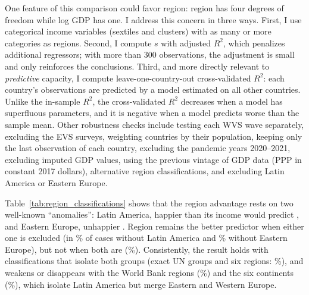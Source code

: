 \documentclass[11pt]{article}
\begin{document}
One feature of this comparison could favor region: region has four degrees of freedom while log GDP has one. I address this concern in three ways. First, I use categorical income variables (sextiles and clusters) with as many or more categories as regions. Second, I compute $s$ with adjusted $R^2$, which penalizes additional regressors; with more than 300 observations, the adjustment is small and only reinforces the conclusions. Third, and more directly relevant to \textit{predictive} capacity, I compute leave-one-country-out cross-validated $R^2$: each country's observations are predicted by a model estimated on all other countries. Unlike the in-sample $R^2$, the cross-validated $R^2$ decreases when a model has superfluous parameters, and it is negative when a model predicts worse than the sample mean. Other robustness checks include testing each WVS wave separately, excluding the EVS surveys, weighting countries by their population, keeping only the last observation of each country, excluding the pandemic years 2020--2021, excluding imputed GDP values, using the previous vintage of GDP data (PPP in constant 2017 dollars), alternative region classifications, and excluding Latin America or Eastern Europe.

Table~\ref{tab:region_classifications} shows that the region advantage rests on two well-known ``anomalies'': Latin America, happier than its income would predict \citep{graham_paradox_2009,rojas_handbook_2016}, and Eastern Europe, unhappier \citep{guriev_unhappiness_2009}. Region remains the better predictor when either one is excluded (in \shareRegionBetterNoLatam\% of cases without Latin America and \shareRegionBetterNoEE\% without Eastern Europe), but not when both are (\shareRegionBetterNoLatamEE\%). Consistently, the result holds with classifications that isolate both groups (exact UN groups and six regions: \shareRegionBetterUN\%), and weakens or disappears with the World Bank regions (\shareRegionBetterWB\%) and the six continents (\shareRegionBetterContinents\%), which isolate Latin America but merge Eastern and Western Europe.
\end{document}
